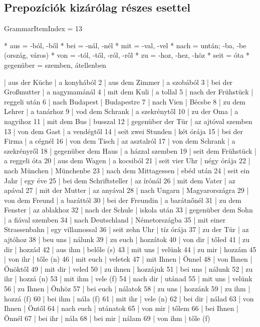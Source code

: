 \documentclass{article}
\newenvironment{desc}{\verbatim}{\endverbatim}
\newenvironment{exmp}{\verbatim}{\endverbatim}
\begin{document}
\subsection{Prepozíciók kizárólag részes esettel}

GrammarItemIndex = 13

\begin{desc}
* aus = -ból, -ből
* bei = -nál, -nél
* mit = -val, -vel
* nach = untán; -ba, -be (ország, város)
* von = -tól, -től, -ról, -ről
* zu = -hoz, -hez, -höz
* seit = óta
* gegenüber = szemben, átellenben
\end{desc}

\begin{exmp}
1 | aus der Küche | a konyhából
2 | aus dem Zimmer | a szobából
3 | bei der Großmutter | a nagymamánál
4 | mit dem Kuli | a tollal
5 | nach der Frühstück | reggeli után
6 | nach Budapest | Budapestre
7 | nach Vien | Bécsbe
8 | zu dem Lehrer | a tanárhoz
9 | vod dem Schrank | a szekrénytől
10 | zu der Oma | a nagyihoz
11 | mit dem Bus | busszal
12 | gegenüber der Tür | az ajtóval szemben
13 | von dem Gast | a vendégtől
14 | seit zwei Stunden | két órája
15 | bei der Firma | a cégnél
16 | von dem Tisch | az asztalról
17 | von dem Schrank | a szekrényről
18 | gegenüber dem Haus | a házzal szemben
19 | seit dem Frühstück | a reggeli óta
20 | aus dem Wagen | a kocsiból
21 | seit vier Uhr | négy órája
22 | nach München | Münchenbe
23 | nach dem Mittagessen | ebéd után
24 | seit ein Jahr | egy éve
25 | bei dem Schriftsteller | az írónál
26 | mit dem Vater | az apával
27 | mit der Mutter | az anyával
28 | nach Ungarn | Magyarországra
29 | von dem Freund | a baráttól
30 | bei der Freundin | a barátnőnél
31 | zu dem Fenster | az ablakhoz
32 | nach der Schule | iskola után
33 | gegenüber dem Sohn | a fiával szemben
34 | nach Deutschland | Németországba
35 | mit einer Strassenbahn | egy villamossal
36 | seit zehn Uhr | tíz órája
37 | zu der Tür | az ajtóhoz
38 | beu uns | nálunk
39 | zu euch | hozzátok
40 | von dir | tőled
41 | zu dir | hozzád
42 | aus ihm | belőle (s)
43 | mit uns | velünk
44 | zu mir | hozzám
45 | von ihr | tőle (n)
46 | mit euch | veletek
47 | mit Ihnen | Önnel
48 | von Ihnen | Önöktől
49 | mit dir | veled
50 | zu ihnen | hozzájuk
51 | bei uns | nálunk
52 | zu ihr | hozzá (n)
53 | mit ihm | vele (f)
54 | nach dir | utánad
55 | mit uns | velünk
56 | zu Ihnen | Önhöz
57 | bei euch | nálatok
58 | zu uns | hozzánk
59 | zu ihm | hozzá (f)
60 | bei ihm | nála (f)
61 | mit ihr | vele (n)
62 | bei dir | nálad
63 | von Ihnen | Öntől
64 | nach euch | utánatok
65 | von mir | tőlem
66 | bei Ihnen | Önnél
67 | bei ihr | nála
68 | bei mir | nálam
69 | von ihm | tőle (f)
\end{exmp}
\end{document}
